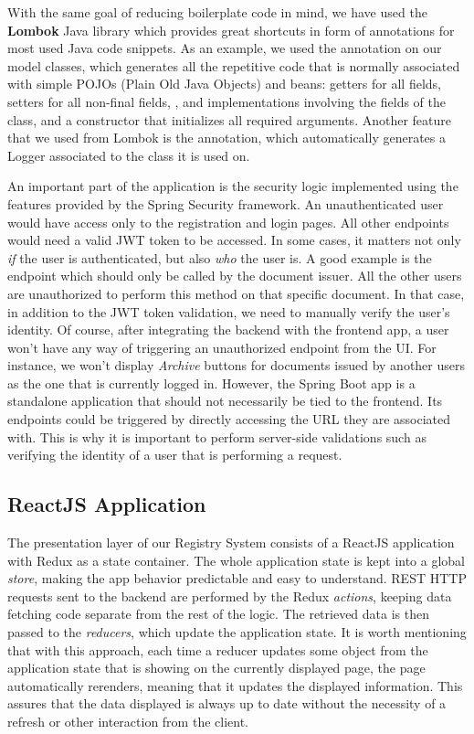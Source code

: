 With the same goal of reducing boilerplate code in mind, we have used the \textbf{Lombok} Java library which provides great shortcuts in form of annotations for most used Java code snippets. As an example, we used the  annotation on our model classes, which generates all the repetitive code that is normally associated with simple POJOs (Plain Old Java Objects) and beans: getters for all fields, setters for all non-final fields, ,  and  implementations involving the fields of the class, and a constructor that initializes all required arguments. Another feature that we used from Lombok is the  annotation, which automatically generates a Logger associated to the class it is used on.

An important part of the application is the security logic implemented using the features provided by the Spring Security framework. An unauthenticated user would have access only to the registration and login pages. All other endpoints would need a valid JWT token to be accessed. In some cases, it matters not only \textit{if} the user is authenticated, but also \textit{who} the user is. A good example is the  endpoint which should only be called by the document issuer. All the other users are unauthorized to perform this method on that specific document. In that case, in addition to the JWT token validation, we need to manually verify the user's identity. Of course, after integrating the backend with the frontend app, a user won't have any way of triggering an unauthorized endpoint from the UI. For instance, we won't display \textit{Archive} buttons for documents issued by another users as the one that is currently logged in. However, the Spring Boot app is a standalone application that should not necessarily be tied to the frontend. Its endpoints could be triggered by directly accessing the URL they are associated with. This is why it is important to perform server-side validations such as verifying the identity of a user that is performing a request.



\subsection{ReactJS Application}
\label{subsection:reactJsApplication}

The presentation layer of our Registry System consists of a ReactJS application with Redux as a state container. The whole application state is kept into a global \textit{store}, making the app behavior predictable and easy to understand. REST HTTP requests sent to the backend are performed by the Redux \textit{actions}, keeping data fetching code separate from the rest of the logic. The retrieved data is then passed to the \textit{reducers}, which update the application state. It is worth mentioning that with this approach, each time a reducer updates some object from the application state that is showing on the currently displayed page, the page automatically rerenders, meaning that it updates the displayed information. This assures that the data displayed is always up to date without the necessity of a refresh or other interaction from the client.

